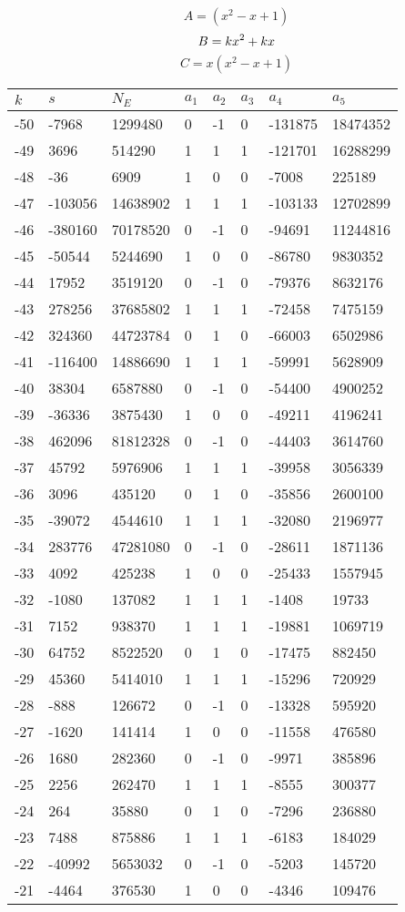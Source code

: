 \documentclass{amsart}
\begin{document}
$$A=(x^2
 - x
 + 1)$$
$$B=k\*x^2
 + k\*x$$
$$C=x(x^2
 - x
 + 1)$$
\begin{longtable}{|l|l|l|lllll|}
\hline
$k$ & $s$ & $N_E$ & $a_1$ & $a_2$ & $a_3$ & $a_4$ & $a_5$\\
\hline
-50&-7968&1299480&0&-1&0&-131875&18474352\\
-49&3696&514290&1&1&1&-121701&16288299\\
-48&-36&6909&1&0&0&-7008&225189\\
-47&-103056&14638902&1&1&1&-103133&12702899\\
-46&-380160&70178520&0&-1&0&-94691&11244816\\
-45&-50544&5244690&1&0&0&-86780&9830352\\
-44&17952&3519120&0&-1&0&-79376&8632176\\
-43&278256&37685802&1&1&1&-72458&7475159\\
-42&324360&44723784&0&1&0&-66003&6502986\\
-41&-116400&14886690&1&1&1&-59991&5628909\\
-40&38304&6587880&0&-1&0&-54400&4900252\\
-39&-36336&3875430&1&0&0&-49211&4196241\\
-38&462096&81812328&0&-1&0&-44403&3614760\\
-37&45792&5976906&1&1&1&-39958&3056339\\
-36&3096&435120&0&1&0&-35856&2600100\\
-35&-39072&4544610&1&1&1&-32080&2196977\\
-34&283776&47281080&0&-1&0&-28611&1871136\\
-33&4092&425238&1&0&0&-25433&1557945\\
-32&-1080&137082&1&1&1&-1408&19733\\
-31&7152&938370&1&1&1&-19881&1069719\\
-30&64752&8522520&0&1&0&-17475&882450\\
-29&45360&5414010&1&1&1&-15296&720929\\
-28&-888&126672&0&-1&0&-13328&595920\\
-27&-1620&141414&1&0&0&-11558&476580\\
-26&1680&282360&0&-1&0&-9971&385896\\
-25&2256&262470&1&1&1&-8555&300377\\
-24&264&35880&0&1&0&-7296&236880\\
-23&7488&875886&1&1&1&-6183&184029\\
-22&-40992&5653032&0&-1&0&-5203&145720\\
-21&-4464&376530&1&0&0&-4346&109476\\

\end{longtable}
\end{document}
